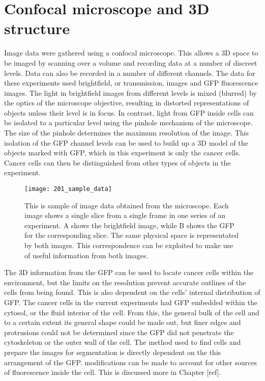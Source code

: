 \section{Confocal microscope and 3D structure}

Image data were gathered using a confocal microscope. This allows a 3D space to be imaged by scanning over a volume and recording data at a number of discreet levels. Data can also be recorded in a number of different channels. The data for these experiments used brightfield, or transmission, images and GFP fluorescence images. The light in brightfield images from different levels is mixed (blurred) by the optics of the microscope objective, resulting in distorted representations of objects unless their level is in focus. In contrast, light from GFP inside cells can be isolated to a particular level using the pinhole mechanism of the microscope. The size of the pinhole determines the maximum resolution of the image. This isolation of the GFP channel levels can be used to build up a 3D model of the objects marked with GFP, which in this experiment is only the cancer cells. Cancer cells can then be distinguished from other types of objects in the experiment.

\begin{figure}[p]
 \centering
 \texttt{[image: 201\_sample\_data]}
 \caption[Sample image data]{
 	This is sample of image data obtained from the microscope. Each image shows a single slice from a single frame in one series of an experiment. A shows the brightfield image, while B shows the GFP for the corresponding slice. The same physical space is representated by both images. This correspondence can be exploited to make use of useful information from both images.
 }
 \label{fig:sampleimagedata}
\end{figure}

The 3D information from the GFP can be used to locate cancer cells within the environment, but the limits on the resolution prevent accurate outlines of the cells from being found. This is also dependent on the cells' internal distribution of GFP. The cancer cells in the current experiments had GFP embedded within the cytosol, or the fluid interior of the cell. From this, the general bulk of the cell and to a certain extent its general shape could be made out, but finer edges and protrusions could not be determined since the GFP did not penetrate the cytoskeleton or the outer wall of the cell. The method used to find cells and prepare the images for segmentation is directly dependent on the this arrangement of the GFP. modifications can be made to account for other sources of fluorescence inside the cell. This is discussed more in Chapter [ref].

